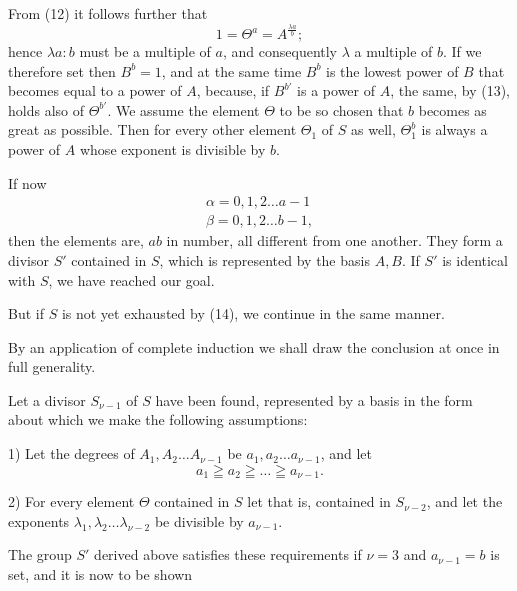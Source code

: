 From (12) it follows further that
\[
1 = \Theta^a = A^{\frac{\lambda a}{b}};
\]
hence $\lambda a : b$ must be a multiple of $a$, and consequently $\lambda$ a multiple of $b$. If we therefore set
then $B^b = 1$, and at the same time $B^b$ is the lowest power of $B$ that becomes equal to a power of $A$, because, if $B^{b'}$ is a power of $A$, the same, by (13), holds also of $\Theta^{b'}$. We assume the element $\Theta$ to be so chosen that $b$ becomes as great as possible. Then for every other element $\Theta_1$ of $S$ as well, $\Theta_1^b$ is always a power of $A$ whose exponent is divisible by $b$.

If now
\[
\begin{gathered}
\alpha = 0, 1, 2 \ldots a-1 \\
\beta = 0, 1, 2 \ldots b-1,
\end{gathered}
\]
then the elements
are, $ab$ in number, all different from one another. They form a divisor $S'$ contained in $S$, which is represented by the basis $A, B$. If $S'$ is identical with $S$, we have reached our goal.

But if $S$ is not yet exhausted by (14), we continue in the same manner.

By an application of complete induction we shall draw the conclusion at once in full generality.

Let a divisor $S_{\nu-1}$ of $S$ have been found, represented by a basis in the form
about which we make the following assumptions:

1) Let the degrees of $A_1, A_2 \ldots A_{\nu-1}$ be $a_1, a_2 \ldots a_{\nu-1}$, and let
\[
a_1 \geqq a_2 \geqq \ldots \geqq a_{\nu-1}.
\]

2) For every element $\Theta$ contained in $S$ let
that is, contained in $S_{\nu-2}$, and let the exponents $\lambda_1, \lambda_2 \ldots \lambda_{\nu-2}$ be divisible by $a_{\nu-1}$.

The group $S'$ derived above satisfies these requirements if $\nu = 3$ and $a_{\nu-1} = b$ is set, and it is now to be shown
